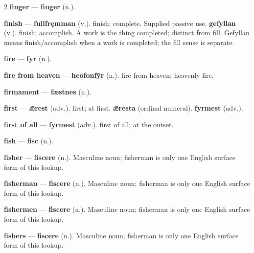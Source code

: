 \begin{multicols}{2}
\textbf{finger} — \textbf{finger} (n.).\par
\textbf{finish} — \textbf{fullfręmman} (v.). finish; complete. Supplied passive use. \textbf{gefyllan} (v.). finish; accomplish. A work is the thing completed; distinct from fill. Gefyllan means finish/accomplish when a work is completed; the fill sense is separate.\par
\textbf{fire} — \textbf{fȳr} (n.).\par
\textbf{fire from heaven} — \textbf{heofonfȳr} (n.). fire from heaven; heavenly fire.\par
\textbf{firmament} — \textbf{fæstnes} (n.).\par
\textbf{first} — \textbf{ǣrest} (adv.). first; at first. \textbf{ǣresta} (ordinal numeral).  \textbf{fyrmest} (adv.).\par
\textbf{first of all} — \textbf{fyrmest} (adv.). first of all; at the outset.\par
\textbf{fish} — \textbf{fisc} (n.).\par
\textbf{fisher} — \textbf{fiscere} (n.). Masculine noun; fisherman is only one English surface form of this lookup.\par
\textbf{fisherman} — \textbf{fiscere} (n.). Masculine noun; fisherman is only one English surface form of this lookup.\par
\textbf{fishermen} — \textbf{fiscere} (n.). Masculine noun; fisherman is only one English surface form of this lookup.\par
\textbf{fishers} — \textbf{fiscere} (n.). Masculine noun; fisherman is only one English surface form of this lookup.\par

\end{multicols}
